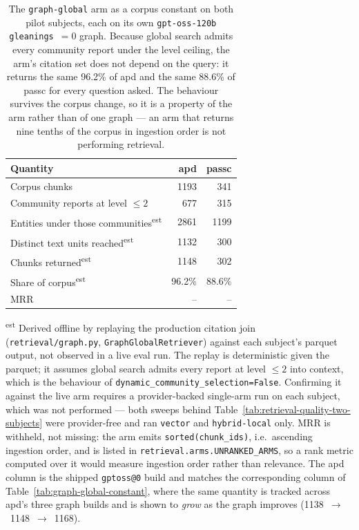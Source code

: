 \begin{table}[htbp]
  \centering
  \caption{The \texttt{graph-global} arm as a corpus constant on both pilot subjects, each on its
    own \texttt{gpt-oss-120b} \texttt{gleanings}~$=0$ graph. Because global search admits every
    community report under the level ceiling, the arm's citation set does not depend on the query:
    it returns the same 96.2\% of apd and the same 88.6\% of passc for every question asked. The
    behaviour survives the corpus change, so it is a property of the arm rather than of one graph
    --- an arm that returns nine tenths of the corpus in ingestion order is not performing
    retrieval.}
  \label{tab:graph-global-two-subjects}
  \begin{tabular}{lrr}
    \toprule
    Quantity & apd & passc \\
    \midrule
    Corpus chunks                                          &   1193 &    341 \\
    Community reports at level $\le 2$                     &    677 &    315 \\
    Entities under those communities\textsuperscript{est}  &   2861 &   1199 \\
    Distinct text units reached\textsuperscript{est}       &   1132 &    300 \\
    \midrule
    Chunks returned\textsuperscript{est}                   &   1148 &    302 \\
    Share of corpus\textsuperscript{est}                   & 96.2\% & 88.6\% \\
    \midrule
    MRR & -- & -- \\
    \bottomrule
  \end{tabular}

  \vspace{0.5em}
  \footnotesize
  \textsuperscript{est} Derived offline by replaying the production citation join
  (\texttt{retrieval/graph.py}, \texttt{GraphGlobalRetriever}) against each subject's parquet
  output, not observed in a live eval run. The replay is deterministic given the parquet; it
  assumes global search admits every report at level $\le 2$ into context, which is the behaviour
  of \texttt{dynamic\_community\_selection=False}. Confirming it against the live arm requires a
  provider-backed single-arm run on each subject, which was not performed --- both sweeps behind
  Table~\ref{tab:retrieval-quality-two-subjects} were provider-free and ran \texttt{vector} and
  \texttt{hybrid-local} only.
  MRR is withheld, not missing: the arm emits \texttt{sorted(chunk\_ids)}, i.e.\ ascending
  ingestion order, and is listed in \texttt{retrieval.arms.UNRANKED\_ARMS}, so a rank metric computed
  over it would measure ingestion order rather than relevance. The apd column is the shipped
  \texttt{gptoss@0} build and matches the corresponding column of
  Table~\ref{tab:graph-global-constant}, where the same quantity is tracked across apd's three
  graph builds and is shown to \emph{grow} as the graph improves (1138~$\rightarrow$~1148~$\rightarrow$~1168).
\end{table}
